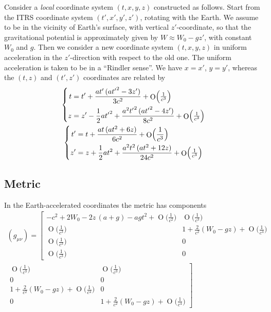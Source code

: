 \documentclass[a4paper,12pt,%
onecolumn,oneside,article,%
british%
]{memoir}
\theoremstyle{remark}
\theoremstyle{innote}
\DeclareMathOperator{\Ord}{O}%
\renewcommand*{\|}[1][]{\nonscript\:#1\vert\nonscript\:\mathopen{}}
\newcommand*{\yW}{W}
\begin{document}
Consider a \emph{local} coordinate system $(t,x,y,z)$ constructed as follows. Start from the ITRS coordinate system $(t',x',y',z')$, rotating with the Earth. We assume to be in the vicinity of Earth's surface, with vertical $z'$-coordinate, so that the gravitational potential is approximately given by $\yW\approx \yW_{0} - g z'$, with constant $\yW_{0}$ and $g$. Then we consider a new coordinate system $(t,x,y,z)$ in uniform acceleration in the $z'$-direction with respect to the old one. The uniform acceleration is taken to be in a \enquote{Rindler sense}. We have $x=x'$, $y=y'$, whereas the $(t,z)$ and $(t',z')$ coordinates are related by
\begin{gather}
  \label{eq:coord_transf_accel}
  \left\{\begin{aligned}
    t &= t' + \frac{a t'\,(a {t'}^2 - 3 z')}{3 c^2}
    + \Ord\Bigl(\tfrac{1}{c^{3}}\Bigr)
\\
z &= z' - \frac12 a {t'}^2
+ \frac{a^2 {t'}^2 \,(a {t'}^2 - 4 z')}{8 c^2}
+ \Ord\Bigl(\tfrac{1}{c^{3}}\Bigr)
\end{aligned}\right.
  \\
  \left\{\begin{aligned}
    t' &= t + \frac{a t\,(a t^2 + 6 z)}{6 c^2}
    + \Ord\Bigl(\frac{1}{c^{3}}\Bigr)
\\
z' &= z + \frac12 a t^2
+ \frac{a^2 t^2 \,(a t^2 + 12 z)}{24 c^2}
+ \Ord\Bigl(\tfrac{1}{c^{3}}\Bigr)
\end{aligned}\right.
\end{gather}

\subsection{Metric}
\label{sec:accel_metric}

In the Earth-accelerated coordinates the metric has components
\begin{multline}
  \label{eq:metric_accel}
  (g_{\mu\nu}) =
  \left[\begin{smallmatrix}
    -c^{2} + 2 \yW_0 - 2 z\,(a + g) - a g t^2
    + \Ord\bigl(\frac{1}{c^{2}}\bigr) &
    \Ord\bigl(\frac{1}{c^{3}}\bigr)
    \\
    \Ord\bigl(\frac{1}{c^{3}}\bigr) &
    1 + \frac{2}{c^{2}} (\yW_0 - g z) + \Ord\bigl(\frac{1}{c^{4}}\bigr)
    \\
    \Ord\bigl(\frac{1}{c^{3}}\bigr) &
    0
    \\
    \Ord\bigl(\frac{1}{c^{3}}\bigr) &
    0
  \end{smallmatrix}\right.
  \\[1ex]
  \left.\begin{smallmatrix}
    \Ord\bigl(\frac{1}{c^{3}}\bigr) &
    \Ord\bigl(\frac{1}{c^{3}}\bigr)
    \\
    0 &
    0
    \\
    1 + \frac{2}{c^{2}} (\yW_0 - g z) + \Ord\bigl(\frac{1}{c^{4}}\bigr) &
    0
    \\
    0 &
    1 + \frac{2}{c^{2}} (\yW_0 - g z) + \Ord\bigl(\frac{1}{c^{4}}\bigr)
  \end{smallmatrix}\right]
\end{multline}
\end{document}

